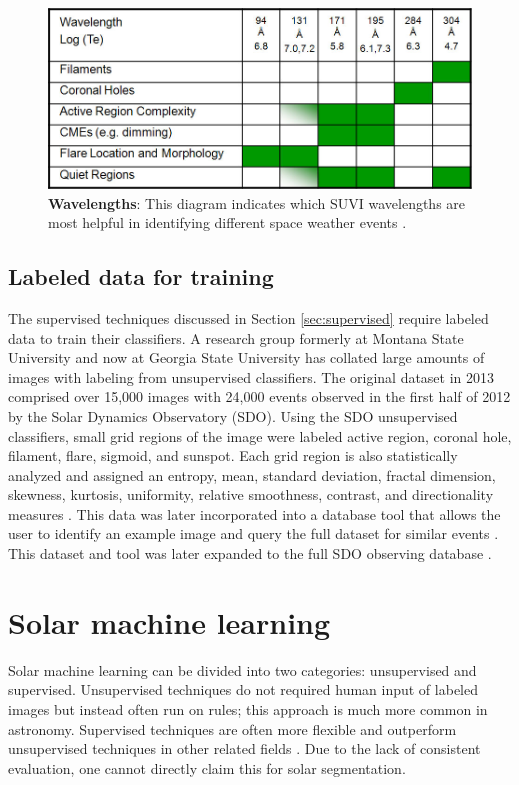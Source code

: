 \documentclass[twoside]{report}
\begin{document}
\begin{figure}[ht]
  \begin{center}
    \includegraphics[scale=0.25]{suvi-wavelength-log.jpg}
    \caption{{\bf Wavelengths}: This diagram indicates which SUVI wavelengths are most helpful in identifying different space weather events \cite{suvibg}.}
    \label{fig:suviwavelength}
 \end{center}
\end{figure}


\subsection{Labeled data for training} 
The supervised techniques discussed in Section \ref{sec:supervised} require labeled data to train their classifiers. A research group formerly at Montana State University and now at Georgia State University has collated large amounts of images with labeling from unsupervised classifiers. The original dataset in 2013 comprised over 15,000 images with 24,000 events observed in the first half of 2012 by the Solar Dynamics Observatory (SDO). Using the SDO unsupervised classifiers, small grid regions of the image were labeled active region, coronal hole, filament, flare, sigmoid, and sunspot. Each grid region is also statistically analyzed and assigned an entropy, mean, standard deviation, fractal dimension, skewness, kurtosis, uniformity, relative smoothness, contrast, and directionality measures \cite{schuh:2013}. This data was later incorporated into a database tool that allows the user to identify an example image and query the full dataset for similar events \cite{banda:2014}. This dataset and tool was later expanded to the full SDO observing database \cite{schuh:2016}. 

\section{Solar machine learning}
Solar machine learning can be divided into two categories: unsupervised and supervised. Unsupervised techniques do not required human input of labeled images but instead often run on rules; this approach is much more common in astronomy. Supervised techniques are often more flexible and outperform unsupervised techniques in other related fields \cite{anzanello:2014, yu:2013,guerra:2011, huang:2017}. Due to the lack of consistent evaluation, one cannot directly claim this for solar segmentation.
\end{document}
